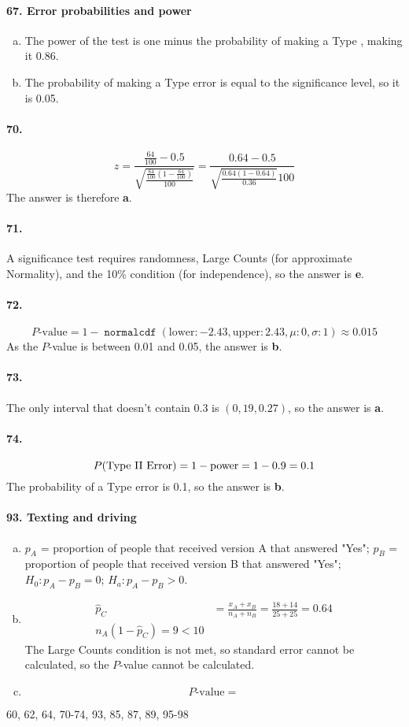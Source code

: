\documentclass[12pt, A4]{article}
\DeclareMathOperator{\normalcdf}{\texttt{normalcdf}}
\newcommand{\normalCDF}[4]{\normalcdf\left(\mathrm{lower}: #1, \mathrm{upper}: #2, \mu: #3, \sigma: #4\right)}
\newcommand{\propse}[2]{\sqrt{\frac{#1\left(1 - #1\right)}{#2}}}
\newcommand{\z}[3]{\frac{#1 - #2}{#3}}
\renewcommand{\Roman}[1]{\MakeUppercase{\romannumeral #1}}
\begin{document}
			\paragraph{67. Error probabilities and power}
				\begin{enumerate}[a.]
					\item 
						The power of the test is one minus the probability of making a Type \Roman{2}, making it 0.86.
					\item 
						The probability of making a Type \Roman{1} error is equal to the significance level, so it is 0.05.
				\end{enumerate}
			\paragraph{70.}
				$$z = \z{\frac{64}{100}}{0.5}{\propse{\frac{64}{100}}{100}} = \z{0.64}{0.5}{\propse{0.64}{0.36}{100}}$$
				The answer is therefore \textbf{a}.
			\paragraph{71.}
				A significance test requires randomness, Large Counts (for approximate Normality), and the 10\% condition (for independence), so the answer is \textbf{e}.
			\paragraph{72.}
				$$P\text{-value} = 1 - \normalCDF{-2.43}{2.43}{0}{1} \approx 0.015$$
				As the $P$-value is between 0.01 and 0.05, the answer is \textbf{b}.
			\paragraph{73.}
				The only interval that doesn't contain 0.3 is $(0,19, 0.27)$, so the answer is \textbf{a}.
			\paragraph{74.}
				$$P(\text{Type \Roman{2} Error}) = 1 - \mathrm{power} = 1 - 0.9 = 0.1$$
				The probability of a Type \Roman{2} error is 0.1, so the answer is \textbf{b}.
			\paragraph{93. Texting and driving}
				\begin{enumerate}[a.]
					\item
						$p_A$ = proportion of people that received version A that answered "Yes"; $p_B$ = proportion of people that received version B that answered "Yes"; $H_0: p_A - p_B = 0$; $H_a: p_A - p_B > 0$.
					\item
						\begin{align*}
							\hat{p}_C &= \frac{x_A + x_B}{n_A + n_B} = \frac{18 + 14}{25 + 25} = 0.64 \\
							n_A(1 - \hat{p}_C) = 9 < 10
						\end{align*}
						The Large Counts condition is not met, so standard error cannot be calculated, so the $P$-value cannot be calculated.
					\item
						$$P\text{-value} =  $$
				\end{enumerate}
			60, 62, 64, 70-74, 93, 85, 87, 89, 95-98
\end{document}
